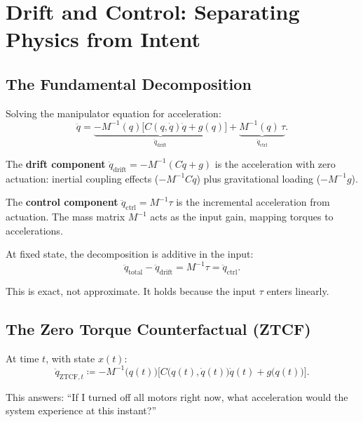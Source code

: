 \documentclass[11pt]{article}
\begin{document}
\section{Drift and Control: Separating Physics from Intent}\label{sec:drift-control}

\subsection{The Fundamental Decomposition}

Solving the manipulator equation for acceleration:
\begin{equation}\label{eq:el-drift-control}
\ddot{q} = \underbrace{-M^{-1}(q)\bigl[C(q,\dot{q})\dot{q} + g(q)\bigr]}_{\ddot{q}_{\mathrm{drift}}} + \underbrace{M^{-1}(q)\,\tau}_{\ddot{q}_{\mathrm{ctrl}}}.
\end{equation}

The \textbf{drift component} $\ddot{q}_{\mathrm{drift}} = -M^{-1}(C\dot{q} + g)$ is the acceleration with zero actuation: inertial coupling effects ($-M^{-1}C\dot{q}$) plus gravitational loading ($-M^{-1}g$).

The \textbf{control component} $\ddot{q}_{\mathrm{ctrl}} = M^{-1}\tau$ is the incremental acceleration from actuation. The mass matrix $M^{-1}$ acts as the input gain, mapping torques to accelerations.

At fixed state, the decomposition is additive in the input:
\begin{equation}
\ddot{q}_{\mathrm{total}} - \ddot{q}_{\mathrm{drift}} = M^{-1}\tau = \ddot{q}_{\mathrm{ctrl}}.
\end{equation}

This is exact, not approximate. It holds because the input $\tau$ enters linearly.

\subsection{The Zero Torque Counterfactual (ZTCF)}

At time $t$, with state $x(t)$:
\begin{equation}\label{eq:ztcf-def}
\ddot{q}_{\mathrm{ZTCF},t} \coloneqq -M^{-1}\bigl(q(t)\bigr)\bigl[C\bigl(q(t),\dot{q}(t)\bigr)\dot{q}(t) + g\bigl(q(t)\bigr)\bigr].
\end{equation}

This answers: ``If I turned off all motors right now, what acceleration would the system experience at this instant?''
\end{document}
